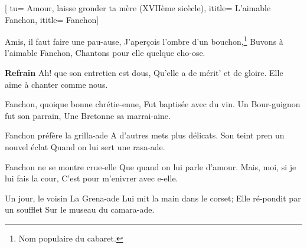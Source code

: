  [
tu= {Amour, laisse gronder ta mère (XVIIème sicècle)},
ititle= {L'aimable Fanchon},
ititle= {Fanchon}]


\beginverse
Amis, il faut faire une pau-ause,
J'aperçois l'ombre d'un bouchon,\footnote {Nom populaire du cabaret.}
Buvons à l'aimable Fanchon,
Chantons pour elle quelque cho-ose.
\endverse

\beginchorus
\textbf {Refrain}
Ah! que son entretien est dous,
Qu'elle a de mérit' et de gloire.
 {Elle aime à chanter comme nous.}
\endchorus

\beginverse
Fanchon, quoique bonne chrétie-enne,
Fut baptisée avec du vin.
Un Bour-guignon fut son parrain,
Une Bretonne sa marrai-aine.
\endverse

\beginverse
Fanchon préfère la grilla-ade
A d'autres mets plus délicats.
Son teint pren un nouvel éclat
Quand on lui sert une rasa-ade.
\endverse

\beginverse
Fanchon ne se montre crue-elle
Que quand on lui parle d'amour.
Mais, moi, si je lui fais la cour,
C'est pour m'enivrer avec e-elle.
\endverse

\beginverse
Un jour, le voisin La Grena-ade
Lui mit la main dans le corset;
Elle ré-pondit par un soufflet
Sur le museau du camara-ade.
\endverse

\endsong